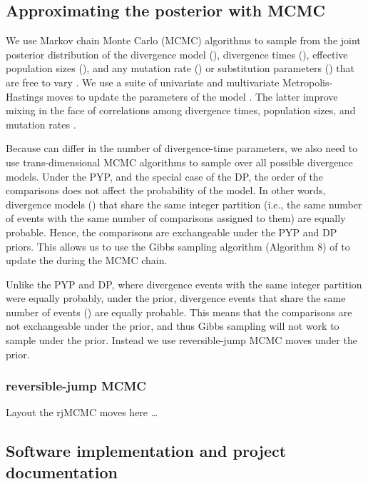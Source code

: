 \documentclass[letterpaper,12pt]{article}
\begin{document}
\subsection{Approximating the posterior with MCMC}

We use Markov chain Monte Carlo (MCMC) algorithms to sample from the joint
posterior distribution of the divergence model (\etimesets), divergence times
(\etimes), effective population sizes (\epopsize), and any mutation rate
(\murate) or substitution parameters (\gfreq) that are free to vary
\citep{Oaks2018ecoevolity,Oaks2019codemog}.
We use a suite of univariate and multivariate Metropolis-Hastings moves to
update the parameters of the model \citep{Metropolis1953,Hastings1970}.
The latter improve mixing in the face of correlations among divergence times,
population sizes, and mutation rates \citep[see][]{Oaks2018ecoevolity}.

Because \etimesets can differ in the number of divergence-time parameters, we
also need to use trans-dimensional MCMC algorithms to sample over all possible
divergence models.
Under the PYP, and the special case of the DP, the order of the comparisons
does not affect the probability of the model.
In other words, divergence models (\etimesets) that share the same integer
partition (i.e., the same number of events with the same number of comparisons
assigned to them) are equally probable.
Hence, the comparisons are exchangeable under the PYP and DP priors.
This allows us to use the Gibbs sampling algorithm (Algorithm 8) of
\citet{Neal2000} to update the \etimesets during the MCMC chain.

Unlike the PYP and DP, where divergence events with the same
integer partition were equally probably, under the
\wunif prior, divergence events that share the same number of events (\nevents) are
equally probable.
This means that the comparisons are not exchangeable under the \wunif prior,
and thus Gibbs sampling will not work to sample \etimesets under the \wunif
prior.
Instead we use reversible-jump MCMC moves under the \wunif prior.

\subsubsection{reversible-jump MCMC}
Layout the rjMCMC moves here \ldots


\subsection{Software implementation and project documentation}
\end{document}
